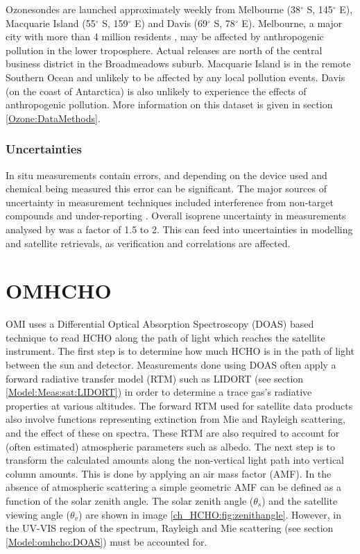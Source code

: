     Ozonesondes are launched approximately weekly from Melbourne (38$^{\circ}$ S, 145$^{\circ}$ E), Macquarie Island (55$^{\circ}$ S, 159$^{\circ}$ E) and Davis (69$^{\circ}$ S, 78$^{\circ}$ E). 
    Melbourne, a major city with more than 4 million residents \parencite{ABS2016}, may be affected by anthropogenic pollution in the lower troposphere.
    Actual releases are north of the central business district in the Broadmeadows suburb.
    Macquarie Island is in the remote Southern Ocean and unlikely to be affected by any local pollution events.
    Davis (on the coast of Antarctica) is also unlikely to experience the effects of anthropogenic pollution.
    More information on this dataset is given in section \ref{Ozone:DataMethods}.
    
    
    \subsubsection{Uncertainties}
    \label{Model:Datasets:uncertainties}
      
      In situ measurements contain errors, and depending on the device used and chemical being measured this error can be significant.
      The major sources of uncertainty in measurement techniques included interference from non-target compounds and under-reporting \parencite[eg.][]{Dunne2018,Guerette2018}.
      Overall isoprene uncertainty in measurements analysed by \textcite{Dunne2018} was a factor of 1.5 to 2.
      This can feed into uncertainties in modelling and satellite retrievals, as verification and correlations are affected.

\section{OMHCHO}
\label{Model:omhcho}
  
  OMI uses a Differential Optical Absorption Spectroscopy (DOAS) based technique to read HCHO along the path of light which reaches the satellite instrument.
  The first step is to determine how much HCHO is in the path of light between the sun and detector.
  Measurements done using DOAS often apply a forward radiative transfer model (RTM) such as LIDORT (see section \ref{Model:Meas:sat:LIDORT}) in order to determine a trace gas's radiative properties at various altitudes.
  The forward RTM used for satellite data products also involve functions representing extinction from Mie and Rayleigh scattering, and the effect of these on spectra.
  These RTM are also required to account for (often estimated) atmospheric parameters such as albedo.
  The next step is to transform the calculated amounts along the non-vertical light path into vertical column amounts.
  This is done by applying an air mass factor (AMF).
  In the absence of atmospheric scattering a simple geometric AMF can be defined as a function of the solar zenith angle. 
  The solar zenith angle ($\theta_s$) and the satellite viewing angle ($\theta_v$) are shown in image \ref{ch_HCHO:fig:zenithangle}.
  However, in the UV-VIS region of the spectrum, Rayleigh and Mie scattering (see section \ref{Model:omhcho:DOAS}) must be accounted for.
  
